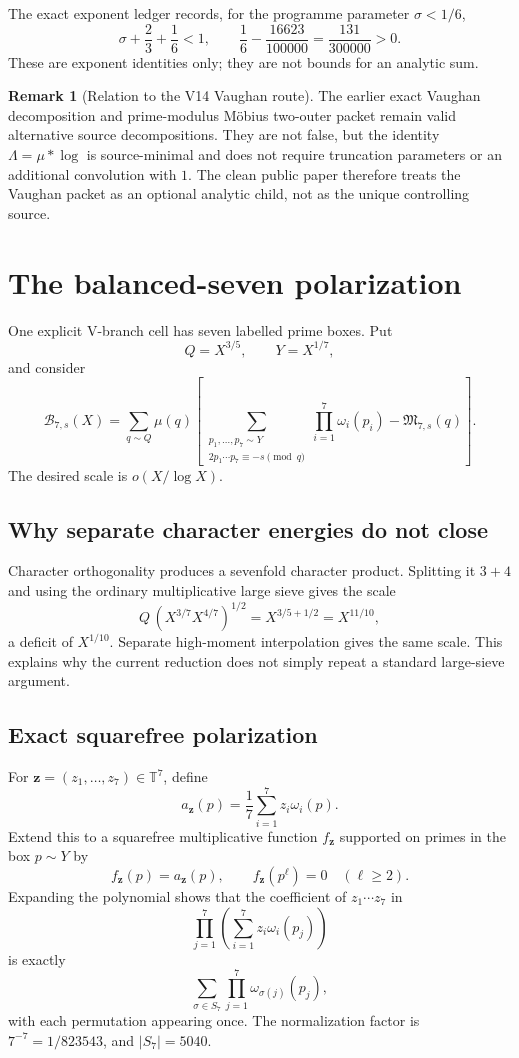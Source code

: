 \documentclass[11pt]{article}
\theoremstyle{definition}
\newtheorem{remark}[theorem]{Remark}
\newcommand{\1}{\mathbf 1}
\newcommand{\B}{\mathcal B}
\begin{document}
The exact exponent ledger records, for the programme parameter
$\sigma<1/6$,
\[
\sigma+\frac23+\frac16<1,
\qquad
\frac16-\frac{16623}{100000}=\frac{131}{300000}>0.
\]
These are exponent identities only; they are not bounds for an analytic sum.

\begin{remark}[Relation to the V14 Vaughan route]
The earlier exact Vaughan decomposition and prime-modulus M\"obius two-outer packet remain
valid alternative source decompositions.  They are not false, but the identity
$\Lambda=\mu*\log$ is source-minimal and does not require truncation parameters or an
additional convolution with $1$.  The clean public paper therefore treats the Vaughan
packet as an optional analytic child, not as the unique controlling source.
\end{remark}

\section{The balanced-seven polarization}

One explicit V-branch cell has seven labelled prime boxes.  Put
\[
Q=X^{3/5},
\qquad Y=X^{1/7},
\]
and consider
\[
\B_{7,s}(X)=
\sum_{q\sim Q}\mu(q)
\left[
\sum_{\substack{p_1,\dots,p_7\sim Y\\2p_1\cdots p_7\equiv-s\pmod q}}
\prod_{i=1}^7\omega_i(p_i)
-\mathfrak M_{7,s}(q)
\right].
\]
The desired scale is $o(X/\log X)$.

\subsection{Why separate character energies do not close}

Character orthogonality produces a sevenfold character product.  Splitting it $3+4$ and
using the ordinary multiplicative large sieve gives the scale
\[
Q\,(X^{3/7}X^{4/7})^{1/2}
=X^{3/5+1/2}
=X^{11/10},
\]
a deficit of $X^{1/10}$.  Separate high-moment interpolation gives the same scale.  This
explains why the current reduction does not simply repeat a standard large-sieve argument.

\subsection{Exact squarefree polarization}

For $\mathbf z=(z_1,\dots,z_7)\in\mathbb T^7$, define
\[
a_{\mathbf z}(p)=\frac17\sum_{i=1}^7z_i\omega_i(p).
\]
Extend this to a squarefree multiplicative function $f_{\mathbf z}$ supported on primes in
the box $p\sim Y$ by
\[
f_{\mathbf z}(p)=a_{\mathbf z}(p),
\qquad f_{\mathbf z}(p^\ell)=0\quad(\ell\ge2).
\]
Expanding the polynomial shows that the coefficient of $z_1\cdots z_7$ in
\[
\prod_{j=1}^7\left(\sum_{i=1}^7z_i\omega_i(p_j)\right)
\]
is exactly
\[
\sum_{\sigma\in S_7}\prod_{j=1}^7\omega_{\sigma(j)}(p_j),
\]
with each permutation appearing once.  The normalization factor is
$7^{-7}=1/823543$, and $|S_7|=5040$.
\end{document}
